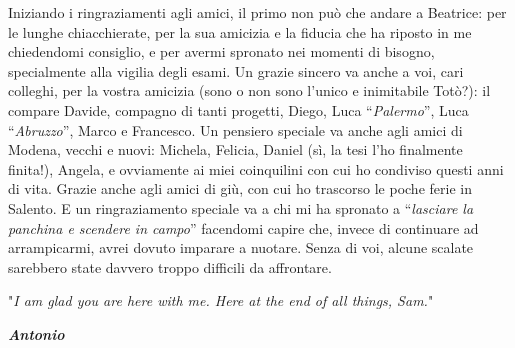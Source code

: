 Iniziando i ringraziamenti agli amici, il primo non può che andare a Beatrice: per le lunghe chiacchierate, per la sua amicizia e la fiducia che ha riposto in me chiedendomi consiglio, e per avermi spronato nei momenti di bisogno, specialmente alla vigilia degli esami. Un grazie sincero va anche a voi, cari colleghi, per la vostra amicizia (sono o non sono l'unico e inimitabile Totò?): il compare Davide, compagno di tanti progetti, Diego, Luca “\textit{Palermo}”, Luca “\textit{Abruzzo}”, Marco e Francesco. Un pensiero speciale va anche agli amici di Modena, vecchi e nuovi: Michela, Felicia, Daniel (sì, la tesi l'ho finalmente finita!), Angela, e ovviamente ai miei coinquilini con cui ho condiviso questi anni di vita. Grazie anche agli amici di giù, con cui ho trascorso le poche ferie in Salento. E un ringraziamento speciale va a chi mi ha spronato a “\textit{lasciare la panchina e scendere in campo}” facendomi capire che, invece di continuare ad arrampicarmi, avrei dovuto imparare a nuotare. Senza di voi, alcune scalate sarebbero state davvero troppo difficili da affrontare.

\noindent "\textit{I am glad you are here with me. Here at the end of all things, Sam.}"

\begin{flushright}
    \textbf{\textit{Antonio}}
\end{flushright}
